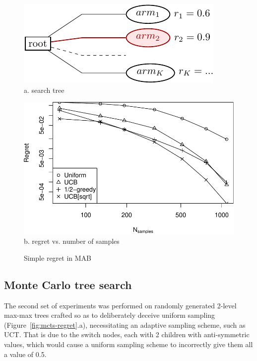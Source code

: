 \documentclass[letterpaper]{article}
\begin{document}
\begin{figure}[h!]
  \begin{minipage}[c]{1.0\linewidth}
    \centering
    \includegraphics[scale=0.8]{onelevel-tree.pdf}\\
    a. search tree
    \vspace{1em}
  \end{minipage}
  \begin{minipage}[c]{1.0\linewidth}
    \centering
    \includegraphics[scale=0.45]{flat-trilevel-k=64-uqb=8.pdf}\\
    b. regret vs. number of samples
  \end{minipage}
  \caption{Simple regret in MAB}
  \label{fig:mab-simple-regret}
\end{figure}

\subsection{Monte Carlo tree search}
\label{sec:emp-mcts}

The second set of experiments was performed on randomly generated
2-level max-max trees crafted so as to deliberately deceive uniform sampling
(Figure~\ref{fig:mcts-regret}.a), necessitating  an adaptive sampling scheme, 
such as UCT. That is due to the switch nodes, each with 2 children with anti-symmetric
values, which would cause a uniform sampling scheme to incorrectly give them all a value of 0.5.
\end{document}
